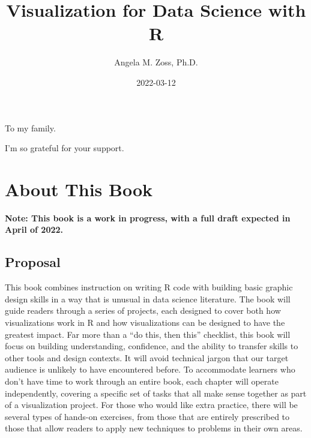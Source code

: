 \documentclass[
]{krantz}
\title{Visualization for Data Science with R}
\author{Angela M. Zoss, Ph.D.}
\date{2022-03-12}
\begin{document}
\maketitle


\thispagestyle{empty}

\begin{center}
To my family.

I'm so grateful for your support.
\end{center}

\setlength{\abovedisplayskip}{-5pt}
\setlength{\abovedisplayshortskip}{-5pt}

{
\hypersetup{linkcolor=}
\setcounter{tocdepth}{2}
\tableofcontents
}
\listoffigures
\listoftables
\hypertarget{about-this-book}{%
\chapter*{About This Book}\label{about-this-book}}


\textbf{Note: This book is a work in progress, with a full draft expected in April of 2022.}

\hypertarget{proposal}{%
\section*{Proposal}\label{proposal}}


This book combines instruction on writing R code with building basic graphic design skills in a way that is unusual in data science literature. The book will guide readers through a series of projects, each designed to cover both how visualizations work in R and how visualizations can be designed to have the greatest impact. Far more than a ``do this, then this'' checklist, this book will focus on building understanding, confidence, and the ability to transfer skills to other tools and design contexts. It will avoid technical jargon that our target audience is unlikely to have encountered before. To accommodate learners who don't have time to work through an entire book, each chapter will operate independently, covering a specific set of tasks that all make sense together as part of a visualization project. For those who would like extra practice, there will be several types of hands-on exercises, from those that are entirely prescribed to those that allow readers to apply new techniques to problems in their own areas.
\end{document}
